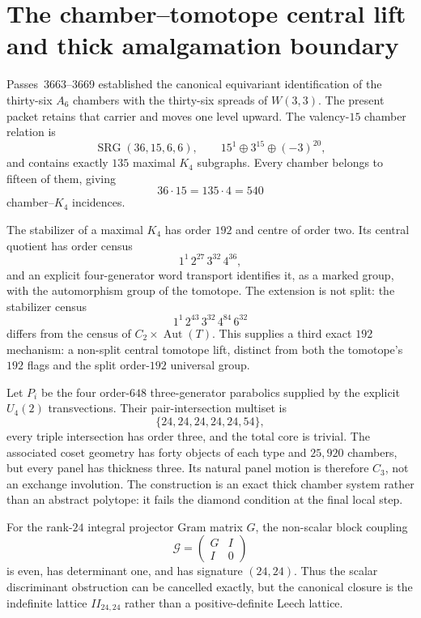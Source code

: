 \section{The chamber--tomotope central lift and thick amalgamation boundary}
\label{sec:bt3670-3686-monster-tomotope}

Passes~3663--3669 established the canonical equivariant identification of the
thirty-six $A_6$ chambers with the thirty-six spreads of $W(3,3)$.  The present
packet retains that carrier and moves one level upward.  The valency-$15$
chamber relation is
\[
 \operatorname{SRG}(36,15,6,6),
 \qquad 15^1\oplus3^{15}\oplus(-3)^{20},
\]
and contains exactly $135$ maximal $K_4$ subgraphs.  Every chamber belongs to
fifteen of them, giving
\[
 36\cdot15=135\cdot4=540
\]
chamber--$K_4$ incidences.

The stabilizer of a maximal $K_4$ has order $192$ and centre of order two.  Its
central quotient has order census
\[
 1^1\,2^{27}\,3^{32}\,4^{36},
\]
and an explicit four-generator word transport identifies it, as a marked
group, with the automorphism group of the tomotope.  The extension is not
split: the stabilizer census
\[
 1^1\,2^{43}\,3^{32}\,4^{84}\,6^{32}
\]
differs from the census of $C_2\times\operatorname{Aut}(T)$.  This supplies a
third exact $192$ mechanism: a non-split central tomotope lift, distinct from
both the tomotope's $192$ flags and the split order-$192$ universal group.

Let $P_i$ be the four order-$648$ three-generator parabolics supplied by the
explicit $U_4(2)$ transvections.  Their pair-intersection multiset is
\[
 \{24,24,24,24,24,54\},
\]
every triple intersection has order three, and the total core is trivial.
The associated coset geometry has forty objects of each type and $25,920$
chambers, but every panel has thickness three.  Its natural panel motion is
therefore $C_3$, not an exchange involution.  The construction is an exact
thick chamber system rather than an abstract polytope: it fails the diamond
condition at the final local step.

For the rank-$24$ integral projector Gram matrix $G$, the non-scalar block
coupling
\[
 \mathcal G=\begin{pmatrix}G&I\\ I&0\end{pmatrix}
\]
is even, has determinant one, and has signature $(24,24)$.  Thus the scalar
discriminant obstruction can be cancelled exactly, but the canonical closure
is the indefinite lattice $II_{24,24}$ rather than a positive-definite Leech
lattice.

